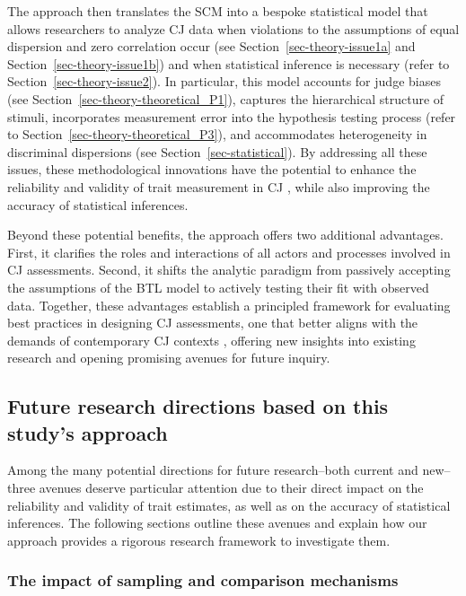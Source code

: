 \documentclass[
  authoryear,
  review,
  1p]{elsarticle}
\begin{document}
The approach then translates the SCM into a bespoke statistical model
that allows researchers to analyze CJ data when violations to the
assumptions of equal dispersion and zero correlation occur (see
Section~\ref{sec-theory-issue1a} and Section~\ref{sec-theory-issue1b})
and when statistical inference is necessary (refer to
Section~\ref{sec-theory-issue2}). In particular, this model accounts for
judge biases (see Section~\ref{sec-theory-theoretical_P1}), captures the
hierarchical structure of stimuli, incorporates measurement error into
the hypothesis testing process (refer to
Section~\ref{sec-theory-theoretical_P3}), and accommodates heterogeneity
in discriminal dispersions (see Section~\ref{sec-statistical}). By
addressing all these issues, these methodological innovations have the
potential to enhance the reliability and validity of trait measurement
in CJ \citep{Perron_et_al_2015}, while also improving the accuracy of
statistical inferences.

Beyond these potential benefits, the approach offers two additional
advantages. First, it clarifies the roles and interactions of all actors
and processes involved in CJ assessments. Second, it shifts the analytic
paradigm from passively accepting the assumptions of the BTL model to
actively testing their fit with observed data. Together, these
advantages establish a principled framework for evaluating best
practices in designing CJ assessments, one that better aligns with the
demands of contemporary CJ contexts \citep{Kelly_et_al_2022}, offering
new insights into existing research and opening promising avenues for
future inquiry.

\subsection{Future research directions based on this study's
approach}\label{sec-discussion_RA}

Among the many potential directions for future research--both current
and new--three avenues deserve particular attention due to their direct
impact on the reliability and validity of trait estimates, as well as on
the accuracy of statistical inferences. The following sections outline
these avenues and explain how our approach provides a rigorous research
framework to investigate them.

\subsubsection{The impact of sampling and comparison
mechanisms}\label{sec-discussion_RA1}
\end{document}
